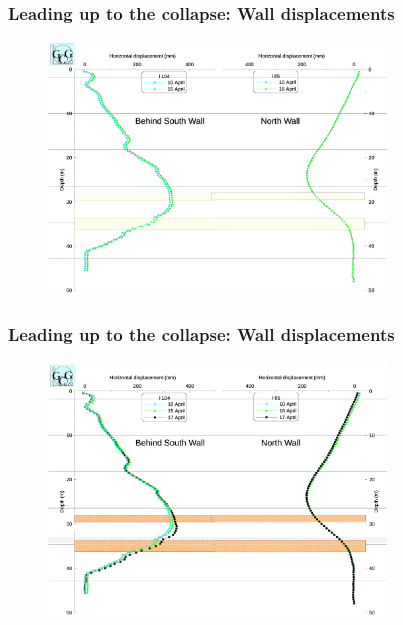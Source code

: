 \documentclass[notes]{beamer}
\begin{document}
\begin{frame}
\frametitle{Leading up to the collapse: Wall displacements}
\begin{figure}[ht]
\centering
\includegraphics[width=0.8\textwidth]{figs/disp2.png}
\end{figure}
\end{frame}

\begin{frame}
\frametitle{Leading up to the collapse: Wall displacements}
\begin{figure}[ht]
	\centering
	\includegraphics[width=0.8\textwidth]{figs/disp3.png}
\end{figure}
\end{frame}
\end{document}

